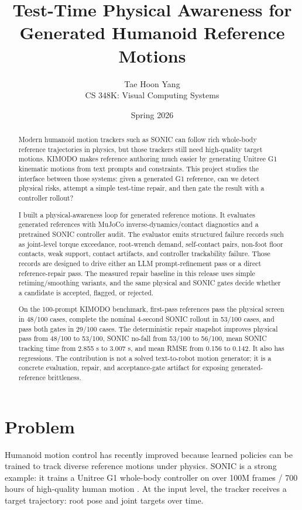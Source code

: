 \documentclass[10pt]{article}
\title{Test-Time Physical Awareness for Generated Humanoid Reference Motions}
\author{Tae Hoon Yang\\CS 348K: Visual Computing Systems}
\date{Spring 2026}
\begin{document}
\maketitle

\begin{abstract}
Modern humanoid motion trackers such as SONIC can follow rich whole-body
reference trajectories in physics, but those trackers still need high-quality
target motions. KIMODO makes reference authoring much easier by generating
Unitree G1 kinematic motions from text prompts and constraints. This project
studies the interface between those systems: given a generated G1 reference,
can we detect physical risks, attempt a simple test-time repair, and then gate
the result with a controller rollout?

I built a physical-awareness loop for generated reference motions. It evaluates
generated references with MuJoCo inverse-dynamics/contact diagnostics
\cite{mujoco} and a pretrained SONIC controller audit. The evaluator emits
structured failure records such as joint-level torque exceedance, root-wrench
demand, self-contact pairs, non-foot floor contacts, weak support, contact
artifacts, and controller trackability failure. Those records are designed to
drive either an LLM prompt-refinement pass or a direct reference-repair pass.
The measured repair baseline in this release uses simple retiming/smoothing
variants, and the same physical and SONIC gates decide whether a candidate is
accepted, flagged, or rejected.

On the 100-prompt KIMODO benchmark, first-pass references pass the physical
screen in 48/100 cases, complete the nominal 4-second SONIC rollout in 53/100
cases, and pass both gates in 29/100 cases. The deterministic repair snapshot
improves physical pass from 48/100 to 53/100, SONIC no-fall from 53/100 to
56/100, mean SONIC tracking time from 2.855 s to 3.007 s, and mean RMSE from
0.156 to 0.142. It also has regressions. The contribution is not a solved
text-to-robot motion generator; it is a concrete evaluation, repair, and
acceptance-gate artifact for exposing generated-reference brittleness.
\end{abstract}

\section{Problem}

Humanoid motion control has recently improved because learned policies can be
trained to track diverse reference motions under physics. SONIC is a strong
example: it trains a Unitree G1 whole-body controller on over 100M frames / 700
hours of high-quality human motion \cite{sonic}. At the input level, the
tracker receives a target trajectory: root pose and joint targets over time.
\end{document}
